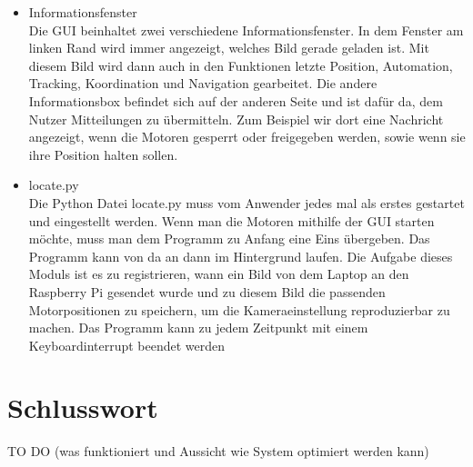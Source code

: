 \documentclass[12pt,a4paper,bibliography=totocnumbered,listof=totocnumbered]{scrartcl}
\begin{document}
\begin{itemize}
\begin{itemize}
\item Informationsfenster\\
Die GUI beinhaltet zwei verschiedene Informationsfenster. In dem Fenster am linken Rand wird immer angezeigt, welches Bild gerade geladen ist. Mit diesem Bild wird dann auch in den Funktionen letzte Position, Automation, Tracking, Koordination und Navigation gearbeitet. Die andere Informationsbox befindet sich auf der anderen Seite und ist dafür da, dem Nutzer Mitteilungen zu übermitteln. Zum Beispiel wir dort eine Nachricht angezeigt, wenn die Motoren gesperrt oder freigegeben werden, sowie wenn sie ihre Position halten sollen.
\item locate.py\\
Die Python Datei locate.py muss vom Anwender jedes mal als erstes gestartet und eingestellt werden. Wenn man die Motoren mithilfe der GUI starten möchte, muss man dem Programm zu Anfang eine Eins übergeben. Das Programm kann von da an dann im Hintergrund laufen. Die Aufgabe dieses Moduls ist es zu registrieren, wann ein Bild von dem Laptop an den Raspberry Pi gesendet wurde und zu diesem Bild die passenden Motorpositionen zu speichern, um die Kameraeinstellung reproduzierbar zu machen. Das Programm kann zu jedem Zeitpunkt mit einem Keyboardinterrupt beendet werden
\end{itemize}
\end{itemize}

\section{Schlusswort}
TO DO (was funktioniert und Aussicht wie System optimiert werden kann)

\newpage
\appendix
\end{document}
